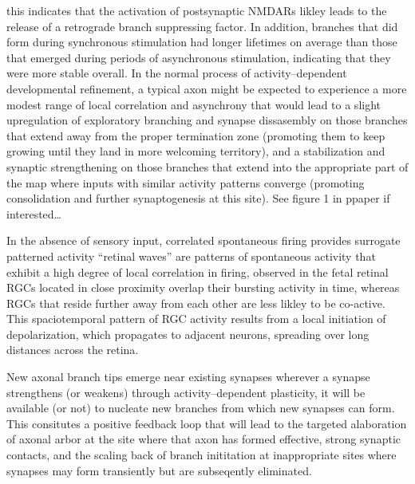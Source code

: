 \documentclass[11pt, a4paper, oneside]{article}   	%
\begin{document}
\begin{outline}
            \supersubpoint this indicates that the activation of postsynaptic NMDARs likley leads to the release of a retrograde branch suppressing factor. In addition, branches that did form during synchronous stimulation had longer lifetimes on average than those that emerged during periods of asynchronous stimulation, indicating that they were more stable overall.
        \subsubpoint In the normal process of activity--dependent developmental refinement, a typical axon might be expected to experience a more modest range of local correlation and asynchrony that would lead to a slight upregulation of exploratory branching and synapse dissasembly on those branches that extend away from the proper termination zone (promoting them to keep growing until they land in more welcoming territory), and a stabilization and synaptic strengthening on those branches that extend into the appropriate part of the map where inputs with similar activity patterns converge (promoting consolidation and further synaptogenesis at this site). See figure 1 in ppaper if interested\ldots
    
 \point In the absence of sensory input, correlated spontaneous firing provides surrogate patterned activity
    \subpoint ``retinal waves'' are patterns of spontaneous activity that exhibit a high degree of local correlation in firing, observed in the fetal retinal
    \subpoint RGCs located in close proximity overlap their bursting activity in time, whereas RGCs that reside further away from each other are less likley to be co-active. This spaciotemporal pattern of RGC activity results from a local initiation of depolarization, which propagates to adjacent neurons, spreading over long distances across the retina.
  
 \point New axonal branch tips emerge near existing synapses
    \subpoint wherever a synapse strengthens (or weakens) through activity--dependent plasticity, it will be available (or not) to nucleate new branches from which new synapses can form.
        \subsubpoint This consitutes a positive feedback loop that will lead to the targeted alaboration of axonal arbor at the site where that axon has formed effective, strong synaptic contacts, and the scaling back of branch inititation at inappropriate sites where synapses may form transiently but are subseqently eliminated.


\end{outline}
\end{document}
